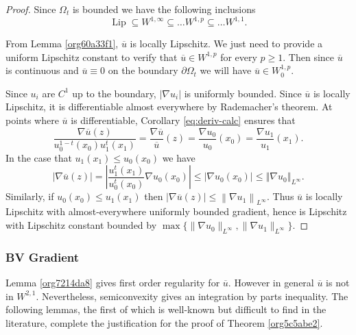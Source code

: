 \documentclass[12pt]{amsart}
\newenvironment{pf}{\begin{proof}}{\end{proof}}
\theoremstyle{definition}
\theoremstyle{remark}
\begin{document}
\begin{pf} Since \(\Omega_t\) is bounded we have the following inclusions
  \[ \operatorname{Lip} \subseteq W^{1,\infty} \subseteq \dots W^{1,p} \subseteq \dots W^{1,1}.
  \]

From Lemma \ref{org60a33f1}, \(\overline{u}\) is locally Lipschitz. We just need
to provide a uniform Lipschitz constant to verify that \(\overline{u} \in
W^{1,p}\) for every \(p \geq 1\). Then since \(\overline{u}\) is continuous and
\(\overline{u} \equiv 0\) on the boundary \(\partial \Omega_t\) we will have \(\overline{u} \in
W^{1,p}_0\).

Since \(u_i\) are $C^1$ up to the boundary, \(|\nabla u_i|\) is uniformly bounded. Since \(\overline{u}\) is locally Lipschitz, it is differentiable almost
everywhere by Rademacher's theorem. At points where \(\overline{u}\) is
differentiable, Corollary \ref{eq:deriv-calc} ensures that
  \[ \frac{\nabla \overline{u}(z)}{u_0^{1-t}(x_0)u_1^t(x_1)} =\frac{\nabla
\overline{u}}{\overline{u}}(z) = \frac{\nabla u_0}{u_0}(x_0) = \frac{\nabla u_1}{u_1}
(x_1).
  \] In the case that \(u_1(x_1) \leq u_0(x_0)\) we have
  \[ |\nabla \overline{u}(z)| = \left|\frac{u_1^t(x_1)}{u_0^t(x_0)}\nabla u_0(x_0)\right|
\leq \left|\nabla u_0(x_0)\right| \leq \left\Vert \nabla u_0\right\Vert_{L^{\infty}}.
  \] Similarly, if \(u_0(x_0) \leq u_1(x_1)\) then $\left|\nabla \overline{u}(z)\right| \leq \left\|\nabla u_1\right\|_{L^{\infty}}$. Thus \(\overline{u}\) is locally Lipschitz with almost-everywhere uniformly
bounded gradient, hence is Lipschitz with Lipschitz constant bounded by \(\max
\{\|\nabla u_0\|_{L^{\infty}}, \|\nabla u_1\|_{L^{\infty}}\}\).
\end{pf}
\subsubsection{BV Gradient}
\label{sec:org919b310}

Lemma \ref{org7214da8} gives first order regularity for \(\overline{u}\). However in general \(\overline{u}\) is not in \(W^{2,1}\). Nevertheless, semiconvexity
gives an integration by parts inequality. The following lemmas, the first of which is well-known but difficult to find in the literature, complete the justification for the proof of Theorem \ref{org5c5abe2}.
\end{document}
